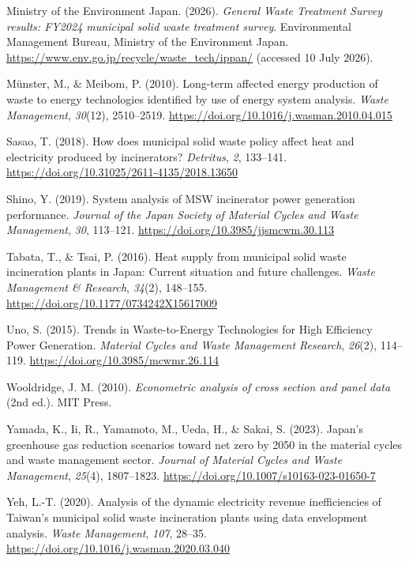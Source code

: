 \documentclass[11pt,letterpaper]{article}
\begin{document}
Ministry of the Environment Japan. (2026). \textit{General Waste Treatment
Survey results: FY2024 municipal solid waste treatment survey}. Environmental
Management Bureau, Ministry of the Environment Japan.
\url{https://www.env.go.jp/recycle/waste_tech/ippan/} (accessed 10 July 2026).

M\"{u}nster, M., \& Meibom, P. (2010). Long-term affected energy production of
waste to energy technologies identified by use of energy system analysis.
\textit{Waste Management}, \textit{30}(12), 2510--2519.
\url{https://doi.org/10.1016/j.wasman.2010.04.015}

Sasao, T. (2018). How does municipal solid waste policy affect heat and
electricity produced by incinerators? \textit{Detritus}, \textit{2}, 133--141.
\url{https://doi.org/10.31025/2611-4135/2018.13650}

Shino, Y. (2019). System analysis of MSW incinerator power generation
performance. \textit{Journal of the Japan Society of Material Cycles and Waste
Management}, \textit{30}, 113--121.
\url{https://doi.org/10.3985/jjsmcwm.30.113}

Tabata, T., \& Tsai, P. (2016). Heat supply from municipal solid waste
incineration plants in Japan: Current situation and future challenges.
\textit{Waste Management \& Research}, \textit{34}(2), 148--155.
\url{https://doi.org/10.1177/0734242X15617009}

Uno, S. (2015). Trends in Waste-to-Energy Technologies for High Efficiency
Power Generation. \textit{Material Cycles and Waste Management Research},
\textit{26}(2), 114--119. \url{https://doi.org/10.3985/mcwmr.26.114}

Wooldridge, J. M. (2010). \textit{Econometric analysis of cross section and
panel data} (2nd ed.). MIT Press.

Yamada, K., Ii, R., Yamamoto, M., Ueda, H., \& Sakai, S. (2023). Japan's
greenhouse gas reduction scenarios toward net zero by 2050 in the material
cycles and waste management sector. \textit{Journal of Material Cycles and
Waste Management}, \textit{25}(4), 1807--1823.
\url{https://doi.org/10.1007/s10163-023-01650-7}

Yeh, L.-T. (2020). Analysis of the dynamic electricity revenue inefficiencies
of Taiwan's municipal solid waste incineration plants using data envelopment
analysis. \textit{Waste Management}, \textit{107}, 28--35.
\url{https://doi.org/10.1016/j.wasman.2020.03.040}

\endgroup
\end{document}
